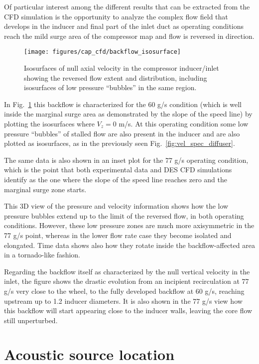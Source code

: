 Of particular interest among the different results that can be extracted from the CFD simulation is the opportunity to analyze the complex flow field that develops in the inducer and final part of the inlet duct as operating conditions reach the mild surge area of the compressor map and flow is reversed in direction. 

\begin{figure}[htb!]
\centering
\texttt{[image: figures/cap\_cfd/backflow\_isosurface]}
\caption[Isosurfaces of null axial velocity]{Isosurfaces of null axial velocity in the compressor inducer/inlet showing the reversed flow extent and distribution, including isosurfaces of low pressure ``bubbles'' in the same region.}
\label{fig:cfd_backflow_isosurfaces}
\end{figure}

In Fig.~\ref{fig:cfd_backflow_isosurfaces} this backflow is characterized for the 60 g/s condition (which is well inside the marginal surge area as demonstrated by the slope of the speed line) by plotting the isosurfaces where $V_z = 0$ m/s. At this operating condition some low pressure ``bubbles'' of stalled flow are also present in the inducer and are also plotted as isosurfaces, as in the previously seen Fig.~\ref{fig:vel_spec_diffuser}. 

The same data is also shown in an inset plot for the 77 g/s operating condition, which is the point that both experimental data and DES CFD simulations identify as the one where the slope of the speed line reaches zero and the marginal surge zone starts.

This 3D view of the pressure and velocity information shows how the low pressure bubbles extend up to the limit of the reversed flow, in both operating conditions. However, these low pressure zones are much more axisymmetric in the 77 g/s point, whereas in the lower flow rate case they become isolated and elongated. Time data shows also how they rotate inside the backflow-affected area in a tornado-like fashion.

Regarding the backflow itself as characterized by the null vertical velocity in the inlet, the figure shows the drastic evolution from an incipient recirculation at 77 g/s very close to the wheel, to the fully developed backflow at 60 g/s, reaching upstream up to 1.2 inducer diameters. It is also shown in the 77 g/s view how this backflow will start appearing close to the inducer walls, leaving  the core flow still unperturbed.

\section{Acoustic source location}

